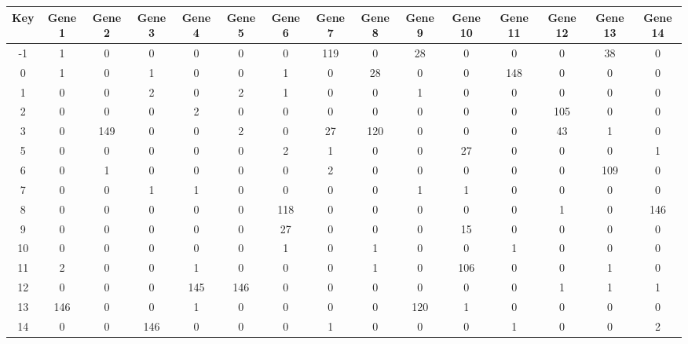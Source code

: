 \begin{tabular}{|c|c|c|c|c|c|c|c|c|c|c|c|c|c|c|}
\hline
Key & Gene 1 & Gene 2 & Gene 3 & Gene 4 & Gene 5 & Gene 6 & Gene 7 & Gene 8 & Gene 9 & Gene 10 & Gene 11 & Gene 12 & Gene 13 & Gene 14 \\
\hline
-1 & 1 & 0 & 0 & 0 & 0 & 0 & 119 & 0 & 28 & 0 & 0 & 0 & 38 & 0 \\
0 & 1 & 0 & 1 & 0 & 0 & 1 & 0 & 28 & 0 & 0 & 148 & 0 & 0 & 0 \\
1 & 0 & 0 & 2 & 0 & 2 & 1 & 0 & 0 & 1 & 0 & 0 & 0 & 0 & 0 \\
2 & 0 & 0 & 0 & 2 & 0 & 0 & 0 & 0 & 0 & 0 & 0 & 105 & 0 & 0 \\
3 & 0 & 149 & 0 & 0 & 2 & 0 & 27 & 120 & 0 & 0 & 0 & 43 & 1 & 0 \\
5 & 0 & 0 & 0 & 0 & 0 & 2 & 1 & 0 & 0 & 27 & 0 & 0 & 0 & 1 \\
6 & 0 & 1 & 0 & 0 & 0 & 0 & 2 & 0 & 0 & 0 & 0 & 0 & 109 & 0 \\
7 & 0 & 0 & 1 & 1 & 0 & 0 & 0 & 0 & 1 & 1 & 0 & 0 & 0 & 0 \\
8 & 0 & 0 & 0 & 0 & 0 & 118 & 0 & 0 & 0 & 0 & 0 & 1 & 0 & 146 \\
9 & 0 & 0 & 0 & 0 & 0 & 27 & 0 & 0 & 0 & 15 & 0 & 0 & 0 & 0 \\
10 & 0 & 0 & 0 & 0 & 0 & 1 & 0 & 1 & 0 & 0 & 1 & 0 & 0 & 0 \\
11 & 2 & 0 & 0 & 1 & 0 & 0 & 0 & 1 & 0 & 106 & 0 & 0 & 1 & 0 \\
12 & 0 & 0 & 0 & 145 & 146 & 0 & 0 & 0 & 0 & 0 & 0 & 1 & 1 & 1 \\
13 & 146 & 0 & 0 & 1 & 0 & 0 & 0 & 0 & 120 & 1 & 0 & 0 & 0 & 0 \\
14 & 0 & 0 & 146 & 0 & 0 & 0 & 1 & 0 & 0 & 0 & 1 & 0 & 0 & 2 \\
\hline
\end{tabular}